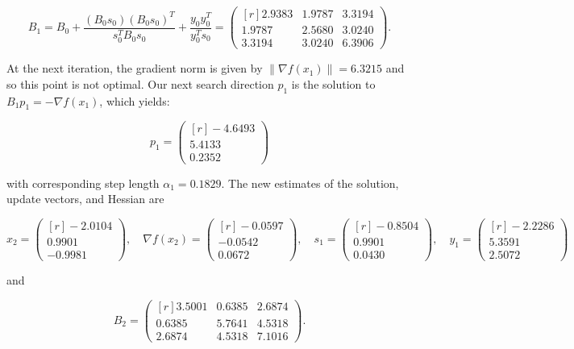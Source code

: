 \begin{solution}
    $$
    B_1 = B_0 + \frac{(B_0 s_0)(B_0 s_0)^T}{s_0^T B_0 s_0} + \frac{y_0 y_0^T}{y_0^T s_0} = \begin{pmatrix*}[r]
        2.9383 &  1.9787 &  3.3194 \\
        1.9787 &  2.5680 &  3.0240 \\
        3.3194 &  3.0240 &  6.3906
    \end{pmatrix*}.
    $$

    At the next iteration, the gradient norm is given by $\| \nabla f(x_1) \| = 6.3215$ and so this point is not 
    optimal. Our next search direction $p_1$ is the solution to $B_1 p_1 = -\nabla f(x_1)$, which yields:

    $$
    p_1 = \begin{pmatrix*}[r]
        -4.6493 \\
         5.4133 \\
         0.2352
    \end{pmatrix*}
    $$

    with corresponding step length $\alpha_1 = 0.1829$. The new estimates of the solution, update vectors, and Hessian 
    are

    $$
    x_2 = \begin{pmatrix*}[r]
        -2.0104 \\
         0.9901 \\
        -0.9981
    \end{pmatrix*}, \quad \nabla f(x_2) = \begin{pmatrix*}[r]
        -0.0597 \\
        -0.0542 \\
         0.0672
    \end{pmatrix*}, \quad s_1 = \begin{pmatrix*}[r]
        -0.8504 \\
         0.9901 \\
         0.0430
    \end{pmatrix*}, \quad y_1 = \begin{pmatrix*}[r]
        -2.2286 \\
         5.3591 \\
         2.5072
    \end{pmatrix*}
    $$

    and 

    $$
    B_2 = \begin{pmatrix*}[r]
        3.5001 & 0.6385 & 2.6874 \\
        0.6385 & 5.7641 & 4.5318 \\
        2.6874 & 4.5318 & 7.1016
    \end{pmatrix*}.
    $$


\end{solution}
